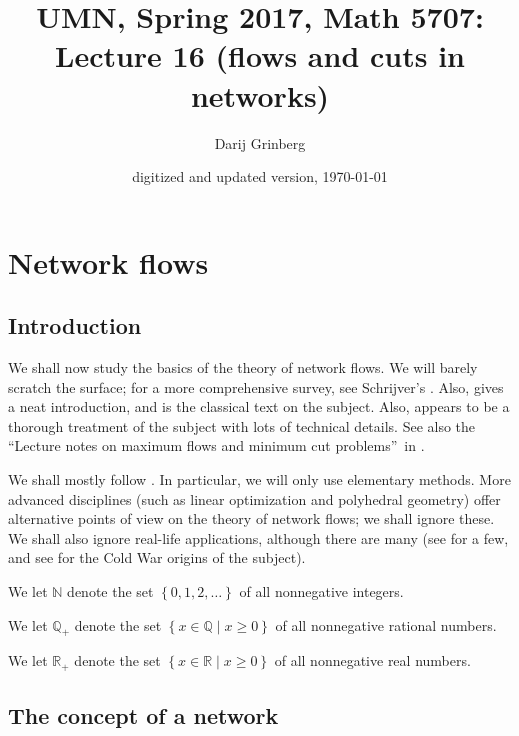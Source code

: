 \documentclass[numbers=enddot,12pt,final,onecolumn,notitlepage]{scrartcl}%
\theoremstyle{definition}
\begin{document}
\title{UMN, Spring 2017, Math 5707: Lecture 16 (flows and cuts in networks)}
\author{Darij Grinberg}
\date{digitized and updated version,
\today
}
\maketitle
\tableofcontents

\section{Network flows}

\subsection{Introduction}

We shall now study the basics of the theory of network flows. We will barely
scratch the surface; for a more comprehensive survey, see Schrijver's
\cite[Chapter 4]{Schrij17}. Also, \cite[\S 11.2]{Martin17} gives a neat
introduction, and \cite{ForFul62} is the classical text on the subject. Also,
\cite{Thalwi08} appears to be a thorough treatment of the subject with lots of
technical details. See also the \textquotedblleft Lecture notes on maximum
flows and minimum cut problems\textquotedblright\ in \cite{Goeman17}.

We shall mostly follow \cite[\S 11.2]{Martin17}. In particular, we will only
use elementary methods. More advanced disciplines (such as linear optimization
and polyhedral geometry) offer alternative points of view on the theory of
network flows; we shall ignore these. We shall also ignore real-life
applications, although there are many (see \cite[Chapter 4]{Schrij17} for a
few, and see \cite[\S 2]{Schrij12} for the Cold War origins of the subject).

We let $\mathbb{N}$ denote the set $\left\{  0,1,2,\ldots\right\}  $ of all
nonnegative integers.

We let $\mathbb{Q}_{+}$ denote the set $\left\{  x\in\mathbb{Q}\mid
x\geq0\right\}  $ of all nonnegative rational numbers.

We let $\mathbb{R}_{+}$ denote the set $\left\{  x\in\mathbb{R}\mid
x\geq0\right\}  $ of all nonnegative real numbers.

\subsection{The concept of a network}
\end{document}
